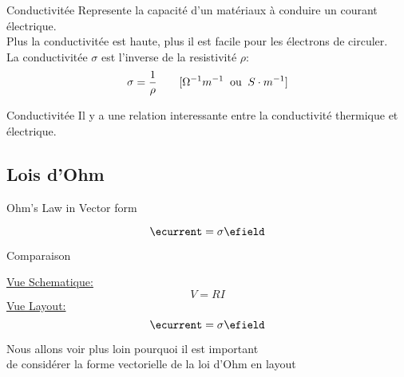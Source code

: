 \begin{frame}{Conductivitée}
    \centering
    \icon[green]{\faExchange*} Represente la capacité d'un matériaux à conduire un courant électrique.\\
    Plus la conductivitée est haute, plus il est facile pour les électrons de circuler.\\
    \vspace{30pt}
    La conductivitée \textbf{$\sigma$} est l'inverse de la resistivité \textbf{$\rho$}:
    \begin{equation}
        \sigma = \frac{1}{\rho} \hspace{2.0em} [\Omega^{-1} m^{-1} \;\;\text{ou}\;\; S\cdot m^{-1}]
    \end{equation}
\end{frame}

\begin{frame}{Conductivitée}
    \centering
    \icon[red]{\faThermometerThreeQuarters} Il y a une relation interessante entre la conductivité thermique et électrique.
\end{frame}

\subsection[1min - Max]{Lois d'Ohm}
\begin{frame}{Ohm's Law in Vector form}
        \begin{twocolumns}[0.5]
        \leftcol
        \begin{equation}
            \ecurrent = \sigma \efield
        \end{equation}
        \rightcol
    \end{twocolumns}        
\end{frame}

\begin{frame}{Comparaison}
        \begin{twocolumns}[0.5]
        \leftcol
            \centering
            \underline{Vue Schematique:}
            \begin{equation*}
                V = R I
            \end{equation*}
        \rightcol
            \centering
            \underline{Vue Layout:}
            \begin{equation*}
                \ecurrent = \sigma \efield
            \end{equation*}
    \end{twocolumns}
    \vspace{30pt}
    \centering
    Nous allons voir plus loin pourquoi il est important\\ de considérer la forme vectorielle de la loi d'Ohm en layout
\end{frame}

